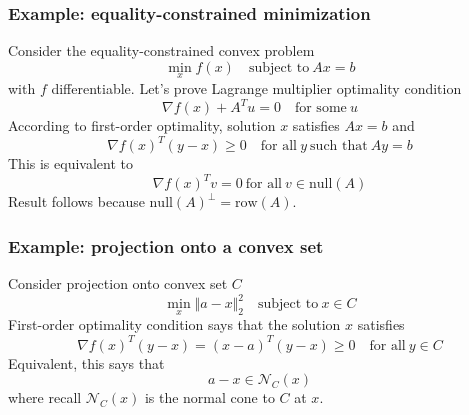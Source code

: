 \documentclass[a4paper]{article}
\begin{document}
{\subsubsection{Example: equality-constrained minimization}
Consider the equality-constrained convex problem
\begin{equation}
  \min_x f(x) \quad \text{subject to} \ Ax = b \nonumber
\end{equation}
with $f$ differentiable. Let's prove Lagrange multiplier optimality condition
\begin{equation}
  \nabla f(x) + A^T u = 0 \quad \text{for some} \ u \nonumber
\end{equation}
According to first-order optimality, solution $x$ satisfies $Ax = b$ and 
\begin{equation}
  \nabla f(x)^T (y-x) \geq 0 \quad \text{for all} \ y \ \text{such that} \ Ay = b \nonumber
\end{equation}
This is equivalent to 
\begin{equation}
  \nabla f(x)^T v = 0  \ \text{for all} \ v \in \text{null}(A) \nonumber
\end{equation}
Result follows because $\text{null}(A)^{\perp} = \text{row}(A)$.

\subsubsection{Example: projection onto a convex set}
Consider projection onto convex set $C$
\begin{equation}
  \min_x \Vert a- x \Vert_2^2 \quad \text{subject to} \ x \in C \nonumber
\end{equation}
First-order optimality condition says that the solution $x$ satisfies 
\begin{equation}
  \nabla f(x)^T (y-x) = (x - a)^T(y-x) \geq 0 \quad \text{for all} \ y \in C \nonumber
\end{equation}
Equivalent, this says that
\begin{equation}
  a - x \in \mathcal{N}_C (x) \nonumber
\end{equation}
where recall $\mathcal{N}_C (x) $ is the normal cone to $C$ at $x$. 

}
\end{document}
